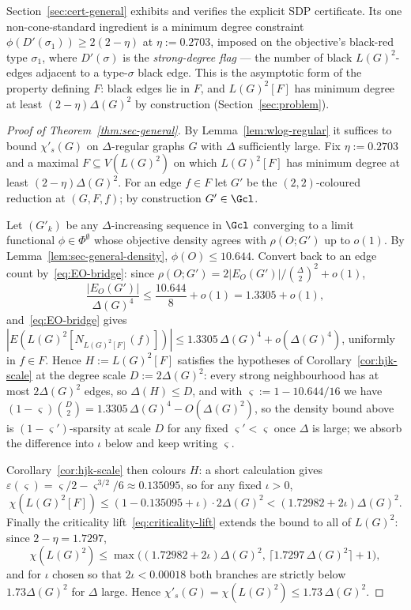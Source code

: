 \documentclass[11pt,a4paper]{article}
\theoremstyle{definition}
\theoremstyle{remark}
\begin{document}
Section~\ref{sec:cert-general} exhibits and verifies the explicit SDP
certificate. Its one non-cone-standard ingredient is a minimum degree
constraint $\phi(D'(\sigma_1)) \geq 2(2 - \eta)$ at $\eta := 0.2703$,
imposed on the objective's black-red type $\sigma_1$, where $D'(\sigma)$
is the \emph{strong-degree flag} --- the number of black
$L(G)^2$-edges adjacent to a type-$\sigma$ black edge. This is the
asymptotic form of the property defining $F$: black edges lie in $F$,
and $L(G)^2[F]$ has minimum degree at least $(2 - \eta)\Delta(G)^2$
by construction (Section~\ref{sec:problem}).

\begin{proof}[Proof of Theorem~\ref{thm:sec-general}]
By Lemma~\ref{lem:wlog-regular} it suffices to bound $\chi'_s(G)$ on
$\Delta$-regular graphs $G$ with $\Delta$ sufficiently large. Fix
$\eta := 0.2703$ and a maximal $F \subseteq V(L(G)^2)$ on which
$L(G)^2[F]$ has minimum degree at least $(2 - \eta)\Delta(G)^2$. For
an edge $f \in F$ let $G'$ be the $(2,2)$-coloured reduction at
$(G, F, f)$; by construction $G' \in \Gcl$.

Let $(G'_k)$ be any $\Delta$-increasing sequence in $\Gcl$ converging
to a limit functional $\phi \in \Phi^\emptyset$ whose objective density
agrees with $\rho(O; G')$ up to $o(1)$. By
Lemma~\ref{lem:sec-general-density}, $\phi(O) \leq 10.644$. Convert
back to an edge count by~\eqref{eq:EO-bridge}: since $\rho(O; G') =
2|E_O(G')|/\binom{\Delta}{2}^2 + o(1)$,
\[
\frac{|E_O(G')|}{\Delta(G)^4}
\leq \frac{10.644}{8} + o(1)
= 1.3305 + o(1),
\]
and~\eqref{eq:EO-bridge} gives
$|E(L(G)^2[N_{L(G)^2[F]}(f)])| \leq 1.3305\,\Delta(G)^4 +
o(\Delta(G)^4)$, uniformly in $f \in F$. Hence $H := L(G)^2[F]$
satisfies the hypotheses of Corollary~\ref{cor:hjk-scale} at the
degree scale $D := 2\Delta(G)^2$: every strong neighbourhood has at
most $2\Delta(G)^2$ edges, so $\Delta(H) \leq D$, and with
$\varsigma := 1 - 10.644/16$ we have $(1 - \varsigma)\binom{D}{2} =
1.3305\,\Delta(G)^4 - O(\Delta(G)^2)$, so the density bound above is
$(1 - \varsigma')$-sparsity at scale $D$ for any fixed
$\varsigma' < \varsigma$ once $\Delta$ is large; we absorb the
difference into $\iota$ below and keep writing $\varsigma$.

Corollary~\ref{cor:hjk-scale} then colours $H$: a short calculation
gives $\varepsilon(\varsigma) = \varsigma/2 - \varsigma^{3/2}/6
\approx 0.135095$, so for any fixed $\iota > 0$,
\[
\chi(L(G)^2[F])
\leq (1 - 0.135095 + \iota)\cdot 2\Delta(G)^2
< (1.72982 + 2\iota)\Delta(G)^2.
\]
Finally the criticality lift~\eqref{eq:criticality-lift} extends the
bound to all of $L(G)^2$: since $2 - \eta = 1.7297$,
\[
\chi(L(G)^2)
\leq \max\bigl((1.72982 + 2\iota)\Delta(G)^2,\,
\lceil 1.7297\,\Delta(G)^2\rceil + 1\bigr),
\]
and for $\iota$ chosen so that $2\iota < 0.00018$ both branches are
strictly below $1.73\Delta(G)^2$ for $\Delta$ large. Hence
$\chi'_s(G) = \chi(L(G)^2) \leq 1.73\,\Delta(G)^2$.
\end{proof}
\end{document}
